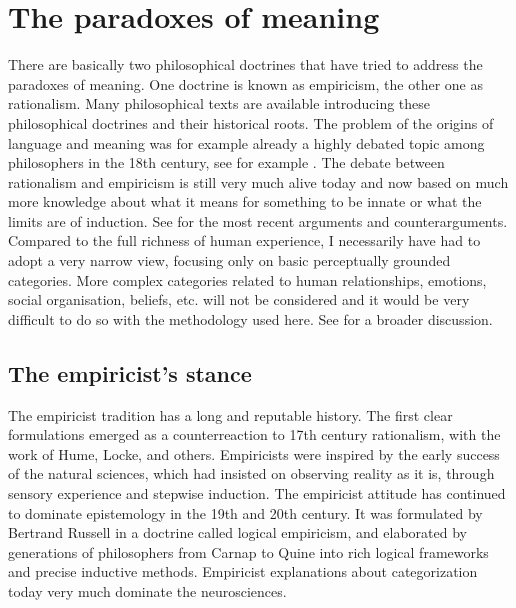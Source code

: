 \section{The paradoxes of meaning}

There are basically two philosophical doctrines that 
have tried to address the paradoxes of meaning. 
One doctrine is known as empiricism, the other one as 
rationalism.
Many philosophical texts are available introducing these
philosophical doctrines and their historical roots. 
The problem of the origins of language and meaning
was for example already a highly debated topic among philosophers in the 18th 
century, see for example \cite{Rousseau:1781}.
\newline
The debate between rationalism and empiricism
is still very much alive today and now based
on much more knowledge about what it means for 
something to be innate or what the limits are of
induction. See \cite{Elman:1998}
for the most recent arguments and counterarguments. Compared
to the full richness of human experience, I necessarily 
have had to adopt a very narrow view, focusing only on
basic perceptually grounded categories. More complex
categories related to human relationships, emotions, 
social organisation, beliefs, etc. will not be 
considered and it would be very difficult to do so 
with the methodology used here. See \cite{Varela:1991}
for a broader discussion.
\subsection{The empiricist's stance}

The empiricist tradition has a long and reputable
history. The first clear formulations emerged as a 
counterreaction to 17th century rationalism, with the work of 
Hume, Locke, and others. Empiricists
were inspired by the early success 
of the natural sciences, which had insisted on observing reality
as it is, through sensory experience and stepwise induction. 
The empiricist attitude has continued to dominate epistemology
in the 19th and 20th century. It was formulated by Bertrand
Russell in a doctrine called logical empiricism, and 
elaborated by generations of philosophers from Carnap to Quine
into rich logical frameworks and precise inductive methods. 
Empiricist explanations about categorization today very much
dominate the neurosciences. 

